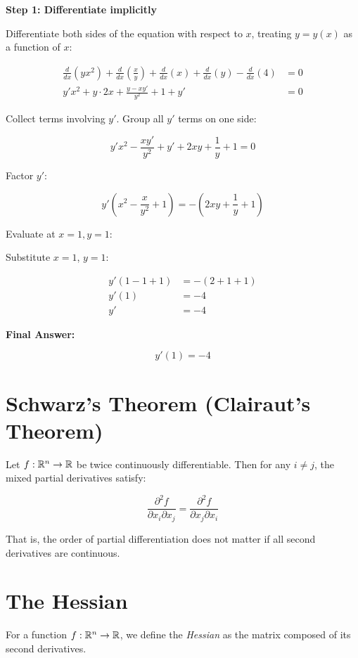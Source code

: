 \textbf{Step 1: Differentiate implicitly}

Differentiate both sides of the equation with respect to \(x\), 
treating \( y = y(x) \) as a function of \(x\):

\begin{align*}
    \frac{d}{dx}(y x^2) + \frac{d}{dx}\left(\frac{x}{y}\right) + \frac{d}{dx}(x) + \frac{d}{dx}(y) - \frac{d}{dx}(4) &= 0 \\
    y' x^2 + y \cdot 2x + \frac{y - x y'}{y^2} + 1 + y' &= 0
\end{align*}

Collect terms involving \( y' \). Group all \( y' \) terms on one side:

\[
    y' x^2 - \frac{x y'}{y^2} + y' + 2xy + \frac{1}{y} + 1 = 0
\]

Factor \( y' \):

\[
    y' \left(x^2 - \frac{x}{y^2} + 1\right) = -\left(2xy + \frac{1}{y} + 1\right)
\]

Evaluate at \( x = 1, y = 1 \):

Substitute \( x = 1 \), \( y = 1 \):

\begin{align*}
    y' (1 - 1 + 1) &= - (2 + 1 + 1) \\
    y' (1) &= -4 \\
    y' &= -4
\end{align*}

\textbf{Final Answer:}

\[
    y'(1) = -4
\]

\section{Schwarz’s Theorem (Clairaut’s Theorem)}

Let \( f : \mathbb{R}^n \to \mathbb{R} \) be twice continuously differentiable. Then for any \( i \ne j \), 
the mixed partial derivatives satisfy:

\[
    \frac{\partial^2 f}{\partial x_i \partial x_j} = \frac{\partial^2 f}{\partial x_j \partial x_i}
\]

That is, the order of partial differentiation does not matter if all second derivatives are continuous.

\section{The Hessian}

For a function \(f:\mathbb{R}^n \to \mathbb{R}\),  we define the \emph{Hessian} as the matrix composed of its second derivatives.

